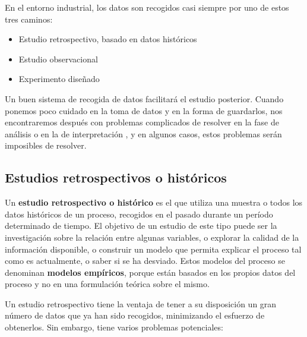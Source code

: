 \documentclass[
  letterpaper,
]{scrbook}
\providecommand{\tightlist}{%
  \setlength{\itemsep}{0pt}\setlength{\parskip}{0pt}}\usepackage{longtable,booktabs,array}
\begin{document}
En el entorno industrial, los datos son recogidos casi siempre por uno
de estos tres caminos:

\begin{itemize}
\tightlist
\item
  Estudio retrospectivo, basado en datos históricos
\item
  Estudio observacional
\item
  Experimento diseñado
\end{itemize}

Un buen sistema de recogida de datos facilitará el estudio posterior.
Cuando ponemos poco cuidado en la toma de datos y en la forma de
guardarlos, nos encontraremos después con problemas complicados de
resolver en la fase de análisis o en la de interpretación , y en algunos
casos, estos problemas serán imposibles de resolver.

\hypertarget{estudios-retrospectivos-o-histuxf3ricos}{%
\subsection{Estudios retrospectivos o
históricos}\label{estudios-retrospectivos-o-histuxf3ricos}}

Un \textbf{estudio retrospectivo o histórico} es el que utiliza una
muestra o todos los datos históricos de un proceso, recogidos en el
pasado durante un período determinado de tiempo. El objetivo de un
estudio de este tipo puede ser la investigación sobre la relación entre
algunas variables, o explorar la calidad de la información disponible, o
construir un modelo que permita explicar el proceso tal como es
actualmente, o saber si se ha desviado. Estos modelos del proceso se
denominan \textbf{modelos empíricos}, porque están basados en los
propios datos del proceso y no en una formulación teórica sobre el
mismo.

Un estudio retrospectivo tiene la ventaja de tener a su disposición un
gran número de datos que ya han sido recogidos, minimizando el esfuerzo
de obtenerlos. Sin embargo, tiene varios problemas potenciales:
\end{document}

